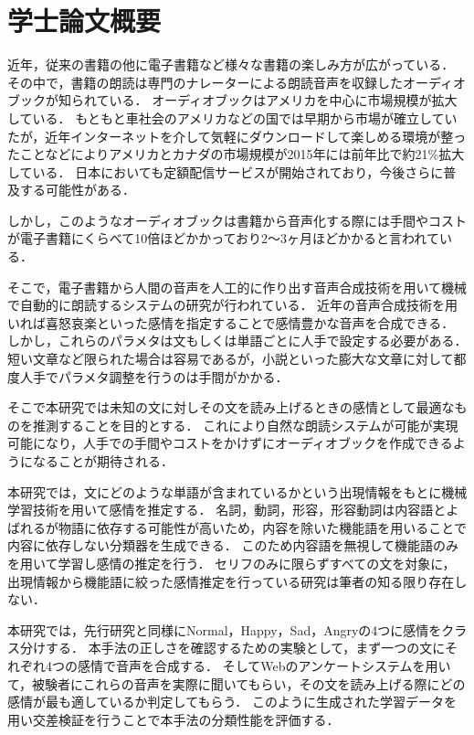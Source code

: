 \chapter*{学士論文概要}
近年，従来の書籍の他に電子書籍など様々な書籍の楽しみ方が広がっている．
その中で，書籍の朗読は専門のナレーターによる朗読音声を収録したオーディオブックが知られている．
オーディオブックはアメリカを中心に市場規模が拡大している．
もともと車社会のアメリカなどの国では早期から市場が確立していたが，近年インターネットを介して気軽にダウンロードして楽しめる環境が整ったことなどによりアメリカとカナダの市場規模が2015年には前年比で約21\%拡大している\cite{wsj}．
日本においても定額配信サービスが開始されており，今後さらに普及する可能性がある．


しかし，このようなオーディオブックは書籍から音声化する際には手間やコストが電子書籍にくらべて10倍ほどかかっており2〜3ヶ月ほどかかると言われている．\cite{ueda}

そこで，電子書籍から人間の音声を人工的に作り出す音声合成技術を用いて機械で自動的に朗読するシステムの研究が行われている．
近年の音声合成技術を用いれば喜怒哀楽といった感情を指定することで感情豊かな音声を合成できる．
しかし，これらのパラメタは文もしくは単語ごとに人手で設定する必要がある．
短い文章など限られた場合は容易であるが，小説といった膨大な文章に対して都度人手でパラメタ調整を行うのは手間がかかる．

そこで本研究では未知の文に対しその文を読み上げるときの感情として最適なものを推測することを目的とする．
これにより自然な朗読システムが可能が実現可能になり，人手での手間やコストをかけずにオーディオブックを作成できるようになることが期待される．

本研究では，文にどのような単語が含まれているかという出現情報をもとに機械学習技術を用いて感情を推定する．
名詞，動詞，形容，形容動詞は内容語とよばれるが物語に依存する可能性が高いため，内容を除いた機能語を用いることで内容に依存しない分類器を生成できる．
このため内容語を無視して機能語のみを用いて学習し感情の推定を行う．
セリフのみに限らずすべての文を対象に，出現情報から機能語に絞った感情推定を行っている研究は筆者の知る限り存在しない．

本研究では，先行研究と同様にNormal，Happy，Sad，Angryの4つに感情をクラス分けする．
本手法の正しさを確認するための実験として，まず一つの文にそれぞれ4つの感情で音声を合成する．
そしてWebのアンケートシステムを用いて，被験者にこれらの音声を実際に聞いてもらい，その文を読み上げる際にどの感情が最も適しているか判定してもらう．
このように生成された学習データを用い交差検証を行うことで本手法の分類性能を評価する．
